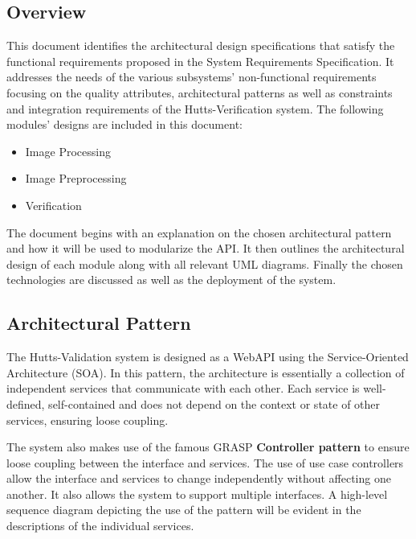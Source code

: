 \documentclass{article}
\begin{document}
	\subsection{Overview}
This document identifies the architectural design specifications that satisfy the functional requirements proposed in the System Requirements Specification. It addresses the needs of the various subsystems' non-functional requirements focusing on the quality attributes, architectural patterns as well as constraints and integration requirements of the Hutts-Verification system.\newline \newline 
The following modules' designs are included in this document:
\begin{itemize}
	\item Image Processing
	\item Image Preprocessing
	\item Verification
\end{itemize}
The document begins with an explanation on the chosen architectural pattern and how it will be used to modularize the API. It then outlines the architectural design of each module along with all relevant UML diagrams. Finally the chosen technologies are discussed as well as the deployment of the system. 

\subsection{Architectural Pattern}
The Hutts-Validation system is designed as a WebAPI using the Service-Oriented Architecture (SOA). In this pattern, the architecture is essentially a collection of independent services that communicate with each other. Each service is well-defined, self-contained and does not depend on the context or state of other services, ensuring loose coupling.
\par \noindent The system also makes use of the famous GRASP \textbf{Controller pattern} to ensure loose coupling between the interface and services. The use of use case controllers allow the interface and services to change independently without affecting one another. It also allows the system to support multiple interfaces. A high-level sequence diagram depicting the use of the pattern will be evident in the descriptions of the individual services.
\end{document}
